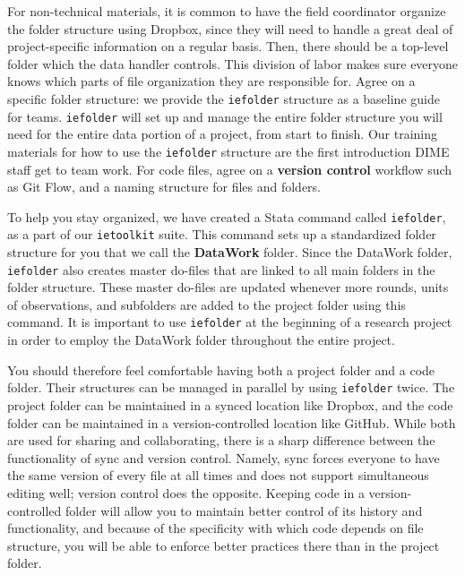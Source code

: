 For non-technical materials,
it is common to have the field coordinator organize
the folder structure using Dropbox,
since they will need to handle a great deal of
project-specific information on a regular basis.
Then, there should be a top-level folder which the data handler controls.
This division of labor makes sure everyone knows
which parts of file organization they are responsible for.
Agree on a specific folder structure: we provide the
\texttt{iefolder}
structure as a baseline guide for teams.
\texttt{iefolder} will set up and manage the entire folder structure
you will need for the entire data portion of a project, from start to finish.
Our training materials for how to use the \texttt{iefolder} structure
are the first introduction DIME staff get to team work.
For code files, agree on a \textbf{version control}\cite{blischak2016quick} workflow such as
Git Flow,
and a naming structure for files and folders.

To help you stay organized, we have created a Stata command
called \texttt{iefolder}, as a part of our \texttt{ietoolkit} suite.
This command sets up a standardized folder structure for you that we call the \textbf{DataWork} folder.
Since the DataWork folder, \texttt{iefolder} also creates master do-files
that are linked to all main folders in the folder structure.
These master do-files are updated whenever more rounds, units of observations,
and subfolders are added to the project folder using this command.
It is important to use \texttt{iefolder} at the beginning of a research project
in order to employ the DataWork folder throughout the entire project.

You should therefore feel comfortable having both a project folder and a code folder.
Their structures can be managed in parallel by using \texttt{iefolder} twice.
The project folder can be maintained in a synced location like Dropbox,
and the code folder can be maintained in a version-controlled location like GitHub.
While both are used for sharing and collaborating,
there is a sharp difference between the functionality of sync and version control.
Namely, sync forces everyone to have the same version of every file at all times
and does not support simultaneous editing well; version control does the opposite.
Keeping code in a version-controlled folder will allow you
to maintain better control of its history and functionality,
and because of the specificity with which code depends on file structure,
you will be able to enforce better practices there than in the project folder.

